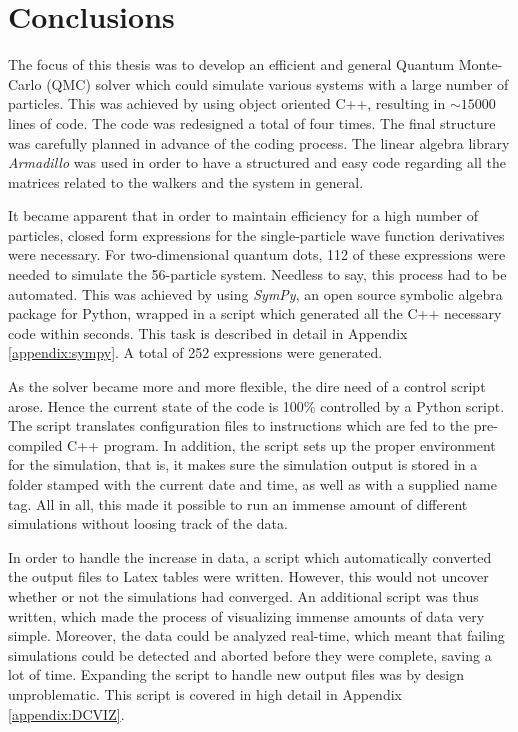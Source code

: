 \chapter{Conclusions}

The focus of this thesis was to develop an efficient and general Quantum Monte-Carlo (QMC) solver which could simulate various systems with a large number of particles. This was achieved by using object oriented C++, resulting in $\sim15000$ lines of code. The code was redesigned a total of four times. The final structure was carefully planned in advance of the coding process. The linear algebra library \textit{Armadillo} \cite{armadillo} was used in order to have a structured and easy code regarding all the matrices related to the walkers and the system in general.

It became apparent that in order to maintain efficiency for a high number of particles, closed form expressions for the single-particle wave function derivatives were necessary. For two-dimensional quantum dots, 112 of these expressions were needed to simulate the 56-particle system. Needless to say, this process had to be automated. This was achieved by using \textit{SymPy}, an open source symbolic algebra package for Python, wrapped in a script which generated all the C++ necessary code within seconds. This task is described in detail in Appendix \ref{appendix:sympy}. A total of 252 expressions were generated.

As the solver became more and more flexible, the dire need of a control script arose. Hence the current state of the code is 100\% controlled by a Python script. The script translates configuration files to instructions which are fed to the pre-compiled C++ program. In addition, the script sets up the proper environment for the simulation, that is, it makes sure the simulation output is stored in a folder stamped with the current date and time, as well as with a supplied name tag. All in all, this made it possible to run an immense amount of different simulations without loosing track of the data.

In order to handle the increase in data, a script which automatically converted the output files to Latex tables were written. However, this would not uncover whether or not the simulations had converged. An additional script was thus written, which made the process of visualizing immense amounts of data very simple. Moreover, the data could be analyzed real-time, which meant that failing simulations could be detected and aborted before they were complete, saving a lot of time. Expanding the script to handle new output files was by design unproblematic. This script is covered in high detail in Appendix \ref{appendix:DCVIZ}.

